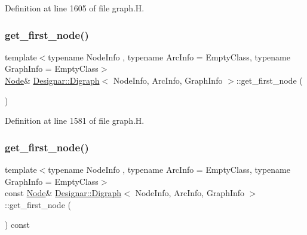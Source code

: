Definition at line 1605 of file graph.\+H.

\mbox{\label{class_designar_1_1_digraph_a420caa785d93decc7b096de9e51644e7}} 
\subsubsection{\texorpdfstring{get\+\_\+first\+\_\+node()}{get\_first\_node()}\hspace{0.1cm}{\footnotesize\ttfamily [1/2]}}
{\footnotesize\ttfamily template$<$typename Node\+Info , typename Arc\+Info  = Empty\+Class, typename Graph\+Info  = Empty\+Class$>$ \\
\hyperlink{class_designar_1_1_digraph_a4dc921c41a480b7946a04170e997d8ae}{Node}\& \hyperlink{class_designar_1_1_digraph}{Designar\+::\+Digraph}$<$ Node\+Info, Arc\+Info, Graph\+Info $>$\+::get\+\_\+first\+\_\+node (\begin{DoxyParamCaption}{ }\end{DoxyParamCaption})\hspace{0.3cm}{\ttfamily [inline]}}



Definition at line 1581 of file graph.\+H.

\mbox{\label{class_designar_1_1_digraph_ada5266ac3e2ed091a37c434dd7484bb9}} 
\subsubsection{\texorpdfstring{get\+\_\+first\+\_\+node()}{get\_first\_node()}\hspace{0.1cm}{\footnotesize\ttfamily [2/2]}}
{\footnotesize\ttfamily template$<$typename Node\+Info , typename Arc\+Info  = Empty\+Class, typename Graph\+Info  = Empty\+Class$>$ \\
const \hyperlink{class_designar_1_1_digraph_a4dc921c41a480b7946a04170e997d8ae}{Node}\& \hyperlink{class_designar_1_1_digraph}{Designar\+::\+Digraph}$<$ Node\+Info, Arc\+Info, Graph\+Info $>$\+::get\+\_\+first\+\_\+node (\begin{DoxyParamCaption}{ }\end{DoxyParamCaption}) const\hspace{0.3cm}{\ttfamily [inline]}}



